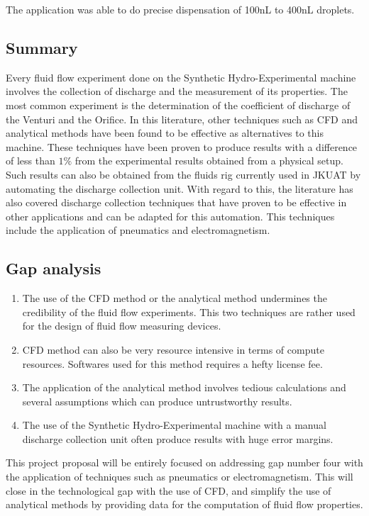 The application was able to do precise dispensation of 100nL to 400nL droplets.

\subsection{Summary}

Every fluid flow experiment done on the Synthetic Hydro-Experimental machine involves the collection of discharge and the measurement of its properties. The most common experiment is the determination of the coefficient of discharge  of the Venturi and the Orifice. In this literature, other techniques such as CFD and analytical methods have been found to be effective as alternatives to this machine. These techniques have been proven to produce results with a difference of less than $1\%$  from the experimental results obtained from a physical setup. Such results can also be obtained from the fluids rig currently used in JKUAT by automating the discharge collection unit. With regard to this, the literature has also covered discharge collection techniques that have proven to be effective in other applications and can be adapted for this automation. This techniques include the application of pneumatics and electromagnetism. 

\subsection{Gap analysis}
\begin{enumerate}
    \item The use of the CFD method or the analytical method  undermines the credibility of the fluid flow experiments. This two techniques are rather used for the design of fluid flow measuring devices.
    \item CFD method can also be very resource intensive in terms of compute resources. Softwares used for this method requires a hefty license fee.
    \item The application of the analytical method involves tedious calculations and several assumptions which can produce untrustworthy results.
    \item The use of the Synthetic Hydro-Experimental machine with a manual discharge collection unit often produce results with huge error margins.  
\end{enumerate}

This project proposal will be entirely focused on addressing gap number four with the application of techniques such as pneumatics or electromagnetism. This will close in the technological gap with the use of CFD, and simplify the use of analytical methods by providing data for the computation of fluid flow properties.    





